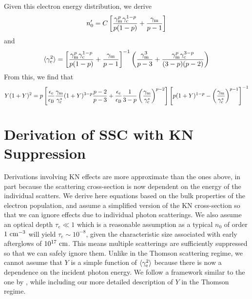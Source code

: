 \documentclass[fleqn,usenatbib]{mnras}
\begin{document}
Given this electron energy distribution, we derive
\begin{equation}
\label{n0:slow}
n_0^{\prime} = C\left[\frac{\gamma_{\rm m}^p\gamma_{\rm c}^{1-p}}{p(1-p)}+\frac{\gamma_{\rm m}}{p-1}\right]
\end{equation}
and
\begin{equation}
\langle \gamma_{\rm e}^2 \rangle = \left[\frac{\gamma_{\rm m}^p\gamma_{\rm c}^{1-p}}{p(1-p)}+\frac{\gamma_{\rm m}}{p-1}\right]^{-1}\left(\frac{\gamma_{\rm m}^3}{p-3}+\frac{\gamma_{\rm m}^{p}\gamma_{\rm c}^{3-p}}{(3-p)(p-2)}\right)
\end{equation}
From this, we find that
\begin{equation}
\label{Yt:slow}
Y(1+Y)^2 = p\left[\frac{\epsilon_{\rm e}}{\epsilon_{\rm B}}\frac{\gamma_{\rm m}}{\gamma_{\rm c}^s}(1+Y)^{3-p}\frac{p-2}{p-3}+\frac{\epsilon_{\rm e}}{\epsilon_{\rm B}}\frac{1}{3-p}\left(\frac{\gamma_{\rm m}}{\gamma_{\rm c}^s}\right)^{p-2}\right]\left[p(1+Y)^{1-p}-\left(\frac{\gamma_{\rm m}}{\gamma_{\rm c}^s}\right)^{p-1}\right]^{-1}
\end{equation}


\section{Derivation of SSC with KN Suppression}\label{appKN}

Derivations involving KN effects are more approximate than the ones above, in part because the scattering cross-section is now dependent on the energy of the individual scatters. We derive here equations based on the bulk properties of the electron population, and assume a simplified version of the KN cross-section so that we can ignore effects due to individual photon scatterings. We also assume an optical depth $\tau_e \ll 1$ which is a reasonable assumption as a typical $n_0$ of order $1\ \rm cm^{-3}$ will yield $\tau_e\sim10^{-8}$, given the characteristic size associated with early afterglows of $10^{17}\ \rm cm$. This means multiple scatterings are sufficiently suppressed so that we can safely ignore them. Unlike in the Thomson scattering regime, we cannot assume that $Y$ is a simple function of $\langle \gamma_{\rm e}^2 \rangle$ because there is now a dependence on the incident photon energy. We follow a framework similar to the one by \citet{Nakar}, while including our more detailed description of $Y$ in the Thomson regime.
\end{document}
